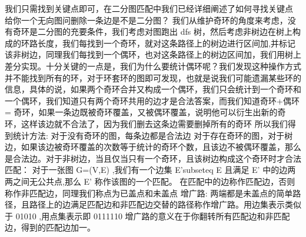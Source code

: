 {}我们只需找到关键点即可，在二分图匹配中我们已经详细阐述了如何寻找关键点\markdownRendererInterblockSeparator
{}
\markdownRendererSectionEnd \markdownRendererSectionBegin
{}\markdownRendererInterblockSeparator
{}给你一个无向图问删除一条边是不是二分图？\markdownRendererParagraphSeparator
{}我们从维护奇环的角度来考虑，没有奇环是二分图的充要条件，我们考虑对图跑出 \markdownRendererDollarSign{}dfs\markdownRendererDollarSign{} 树，然后考虑非树边在树上构成的环路长度，我们每找到一个奇环，就对这条路径上的树边进行区间加,并标记该非树边，同理我们每找到一个偶环，也对这条路径上的树边区间加，我们用树上差分实现。十分关键的一点是，我们为什么要统计偶环呢？我们发现这种操作方式并不能找到所有的环，对于环套环的图即可发现，也就是说我们可能遗漏某些环的信息，具体的说，如果两个奇环合并又构成一个偶环，我们只会统计到一个奇环和一个偶环，我们知道只有两个奇环共用的边才是合法答案，而我们知道奇环+偶环 \markdownRendererDollarSign{}=\markdownRendererDollarSign{} 奇环，如果一条边既被奇环覆盖，又被偶环覆盖，说明他可以衍生出新的奇环，这样该边就不合法了，因为我们删去这条边需要删掉所有的奇环\markdownRendererParagraphSeparator
{}所以我们得到统计方法:\markdownRendererParagraphSeparator
{}对于没有奇环的图，每条边都是合法边\markdownRendererParagraphSeparator
{}对于存在奇环的图，对于树边，如果该边被奇环覆盖的次数等于统计的奇环个数，且该边不被偶环覆盖，那么是合法边。对于非树边，当且仅当只有一个奇环，且该树边构成这个奇环时才合法\markdownRendererParagraphSeparator
{}
\markdownRendererSectionEnd 
\markdownRendererSectionEnd \markdownRendererSectionBegin
{}\markdownRendererInterblockSeparator
{}\markdownRendererSectionBegin
{}\markdownRendererInterblockSeparator
{}匹配：\markdownRendererParagraphSeparator
{}对于一张图\markdownRendererDollarSign{} G=(V,E) \markdownRendererDollarSign{},我们有一个边集\markdownRendererDollarSign{} E\markdownRendererCircumflex{}\markdownRendererLeftBrace{}'\markdownRendererRightBrace{}\markdownRendererBackslash{}subseteq E \markdownRendererDollarSign{}且满足\markdownRendererDollarSign{} E\markdownRendererCircumflex{}\markdownRendererLeftBrace{}'\markdownRendererRightBrace{} \markdownRendererDollarSign{}中的边两两之间无公共点,那么\markdownRendererDollarSign{} E\markdownRendererCircumflex{}\markdownRendererLeftBrace{}'\markdownRendererRightBrace{} \markdownRendererDollarSign{}称作该图的一个匹配。 在匹配中的边称作匹配边，否则称作非匹配边，同理我们称点为已盖点和未盖点\markdownRendererParagraphSeparator
{}增广路:\markdownRendererParagraphSeparator
{}两端都是未盖点的简单路径，且路径上的边满足匹配边和非匹配边交替的路径称作增广路。用边集表示类似于\markdownRendererDollarSign{} 01010 \markdownRendererDollarSign{},用点集表示即\markdownRendererDollarSign{} 0111110 \markdownRendererDollarSign{}增广路的意义在于你翻转所有匹配边和非匹配边，得到的匹配边加一。\markdownRendererParagraphSeparator
